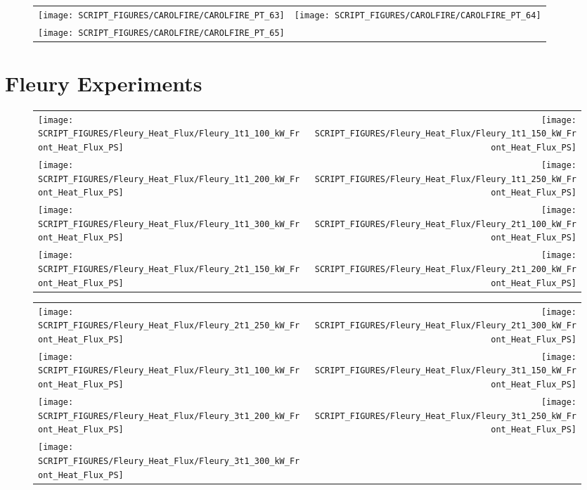 \begin{figure}[!ht]
\begin{tabular*}{\textwidth}{l@{\extracolsep{\fill}}r}
\texttt{[image: SCRIPT\_FIGURES/CAROLFIRE/CAROLFIRE\_PT\_63]} &
\texttt{[image: SCRIPT\_FIGURES/CAROLFIRE/CAROLFIRE\_PT\_64]} \\
\texttt{[image: SCRIPT\_FIGURES/CAROLFIRE/CAROLFIRE\_PT\_65]}
\end{tabular*}
\end{figure}

\clearpage

\section{Fleury Experiments}

\begin{figure}[!ht]
\begin{tabular*}{\textwidth}{l@{\extracolsep{\fill}}r}
\texttt{[image: SCRIPT\_FIGURES/Fleury\_Heat\_Flux/Fleury\_1t1\_100\_kW\_Front\_Heat\_Flux\_PS]} &
\texttt{[image: SCRIPT\_FIGURES/Fleury\_Heat\_Flux/Fleury\_1t1\_150\_kW\_Front\_Heat\_Flux\_PS]} \\
\texttt{[image: SCRIPT\_FIGURES/Fleury\_Heat\_Flux/Fleury\_1t1\_200\_kW\_Front\_Heat\_Flux\_PS]} &
\texttt{[image: SCRIPT\_FIGURES/Fleury\_Heat\_Flux/Fleury\_1t1\_250\_kW\_Front\_Heat\_Flux\_PS]} \\
\texttt{[image: SCRIPT\_FIGURES/Fleury\_Heat\_Flux/Fleury\_1t1\_300\_kW\_Front\_Heat\_Flux\_PS]} &
\texttt{[image: SCRIPT\_FIGURES/Fleury\_Heat\_Flux/Fleury\_2t1\_100\_kW\_Front\_Heat\_Flux\_PS]} \\
\texttt{[image: SCRIPT\_FIGURES/Fleury\_Heat\_Flux/Fleury\_2t1\_150\_kW\_Front\_Heat\_Flux\_PS]} &
\texttt{[image: SCRIPT\_FIGURES/Fleury\_Heat\_Flux/Fleury\_2t1\_200\_kW\_Front\_Heat\_Flux\_PS]}
\end{tabular*}
\end{figure}

\begin{figure}[!ht]
\begin{tabular*}{\textwidth}{l@{\extracolsep{\fill}}r}
\texttt{[image: SCRIPT\_FIGURES/Fleury\_Heat\_Flux/Fleury\_2t1\_250\_kW\_Front\_Heat\_Flux\_PS]} &
\texttt{[image: SCRIPT\_FIGURES/Fleury\_Heat\_Flux/Fleury\_2t1\_300\_kW\_Front\_Heat\_Flux\_PS]} \\
\texttt{[image: SCRIPT\_FIGURES/Fleury\_Heat\_Flux/Fleury\_3t1\_100\_kW\_Front\_Heat\_Flux\_PS]} &
\texttt{[image: SCRIPT\_FIGURES/Fleury\_Heat\_Flux/Fleury\_3t1\_150\_kW\_Front\_Heat\_Flux\_PS]} \\
\texttt{[image: SCRIPT\_FIGURES/Fleury\_Heat\_Flux/Fleury\_3t1\_200\_kW\_Front\_Heat\_Flux\_PS]} &
\texttt{[image: SCRIPT\_FIGURES/Fleury\_Heat\_Flux/Fleury\_3t1\_250\_kW\_Front\_Heat\_Flux\_PS]} \\
\texttt{[image: SCRIPT\_FIGURES/Fleury\_Heat\_Flux/Fleury\_3t1\_300\_kW\_Front\_Heat\_Flux\_PS]}
\end{tabular*}
\end{figure}

